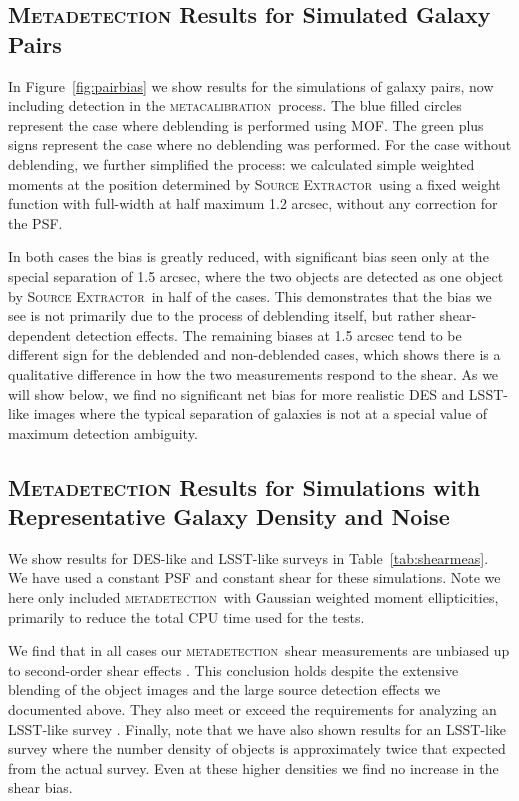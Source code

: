 \documentclass[iop, twocolappendix, appendixfloats, numberedappendix, apj]{hackemulateapj}
\newcommand{\mcal}{\textsc{metacalibration}}
\newcommand{\mdet}{\textsc{metadetection}}
\newcommand{\sx}{\textsc{Source Extractor}}
\begin{document}
\subsection{\textsc{Metadetection} Results for Simulated Galaxy Pairs}
\label{sec:mdetpairs}

In Figure~\ref{fig:pairbias} we show results for the simulations of galaxy
pairs, now including detection in the \mcal\ process. The blue filled circles
represent the case where deblending is performed using MOF. The green plus
signs represent the case where no deblending was performed. For the case
without deblending,  we further simplified the process: we calculated
simple weighted moments at the position determined by \sx\ using a fixed weight function
with full-width at half maximum 1.2 arcsec, without any correction for the PSF.

In both cases the bias is greatly reduced, with significant bias seen only at
the special separation of 1.5 arcsec, where the two objects are detected as one
object by \sx\ in half of the cases. This demonstrates that the bias we see is
not primarily due to the process of deblending itself, but rather
shear-dependent detection effects. The remaining biases at 1.5 arcsec tend to
be different sign for the deblended and non-deblended cases, which shows there
is a qualitative difference in how the two measurements respond to the shear.
As we will show below, we find no significant net bias for more realistic DES
and LSST-like images where the typical separation of galaxies is not at a
special value of maximum detection ambiguity.

\subsection{\textsc{Metadetection} Results for Simulations with Representative Galaxy Density and Noise}
\label{sec:res:constpsf}

We show results for DES-like and LSST-like surveys in Table~\ref{tab:shearmeas}.
We have used a constant PSF and constant shear for these simulations.
Note we here only included \mdet\ with Gaussian weighted moment ellipticities,
primarily to reduce the total CPU time used for the tests.

We find that in all cases our \mdet\ shear measurements are unbiased up to
second-order shear effects \citep[we expect a bias of a few parts in 10000 for
shears of 0.02, see][]{SheldonMcal2017}. This conclusion holds despite the
extensive blending of the object images and the large source detection effects
we documented above. They also meet or exceed the requirements for analyzing an
LSST-like survey \citep[e.g.,][]{huterer2006}. Finally, note that we have also
shown results for an LSST-like survey where the number density of objects is
approximately twice that expected from the actual survey.  Even at these higher
densities we find no increase in the shear bias.
\end{document}
